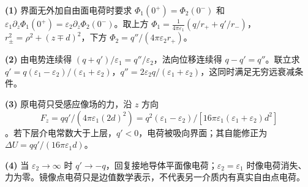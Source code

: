 \par\noindent\textbf{(1)} 界面无外加自由面电荷时要求 \(\Phi_1(0^+)=\Phi_2(0^-)\) 和 \(\varepsilon_1\partial_z\Phi_1(0^+)=\varepsilon_2\partial_z\Phi_2(0^-)\)。取上方 \(\Phi_1=\frac{1}{4\pi\varepsilon_1}(q/r_++q'/r_-)\)，\(r_\pm^2=\rho^2+(z\mp d)^2\)，下方 \(\Phi_2=q''/(4\pi\varepsilon_2r_+)\)。
\par\noindent\textbf{(2)} 由电势连续得 \((q+q')/\varepsilon_1=q''/\varepsilon_2\)，法向位移连续得 \(q-q'=q''\)。联立求 \(q'=q(\varepsilon_1-\varepsilon_2)/(\varepsilon_1+\varepsilon_2)\)，\(q''=2\varepsilon_2q/(\varepsilon_1+\varepsilon_2)\)，这同时满足无穷远衰减条件。
\par\noindent\textbf{(3)} 原电荷只受感应像场的力，沿 \(z\) 方向 \[F_z=qq'/(4\pi\varepsilon_1(2d)^2)=q^2(\varepsilon_1-\varepsilon_2)/[16\pi\varepsilon_1(\varepsilon_1+\varepsilon_2)d^2]\]。若下层介电常数大于上层，\(q'<0\)，电荷被吸向界面；其自能修正为 \(\Delta U=qq'/(16\pi\varepsilon_1d)\)。
\par\noindent\textbf{(4)} 当 \(\varepsilon_2\to\infty\) 时 \(q'\to-q\)，回复接地导体平面像电荷；\(\varepsilon_2=\varepsilon_1\) 时像电荷消失、力为零。镜像点电荷只是边值数学表示，不代表另一介质内有真实自由点电荷。
